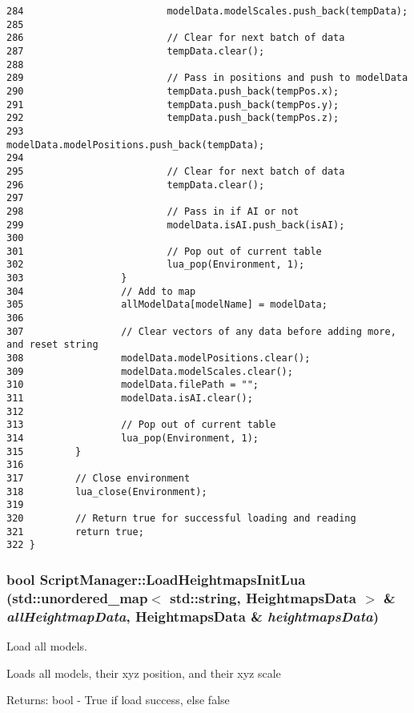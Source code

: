 \begin{Code}
\begin{verbatim}
284                         modelData.modelScales.push_back(tempData);
285 
286                         // Clear for next batch of data
287                         tempData.clear();
288 
289                         // Pass in positions and push to modelData
290                         tempData.push_back(tempPos.x);
291                         tempData.push_back(tempPos.y);
292                         tempData.push_back(tempPos.z);
293                         modelData.modelPositions.push_back(tempData);
294 
295                         // Clear for next batch of data
296                         tempData.clear();
297 
298                         // Pass in if AI or not
299                         modelData.isAI.push_back(isAI);
300 
301                         // Pop out of current table
302                         lua_pop(Environment, 1);
303                 }
304                 // Add to map
305                 allModelData[modelName] = modelData;
306 
307                 // Clear vectors of any data before adding more, and reset string
308                 modelData.modelPositions.clear();
309                 modelData.modelScales.clear();
310                 modelData.filePath = "";
311                 modelData.isAI.clear();
312 
313                 // Pop out of current table
314                 lua_pop(Environment, 1);
315         }
316 
317         // Close environment
318         lua_close(Environment);
319 
320         // Return true for successful loading and reading
321         return true;
322 }
\end{verbatim}
\end{Code}


\hypertarget{class_script_manager_3d83ba0f6648aad0eb0bca48665e93d4}{
\subsubsection[LoadHeightmapsInitLua]{\setlength{\rightskip}{0pt plus 5cm}bool ScriptManager::LoadHeightmapsInitLua (std::unordered\_\-map$<$ std::string, {\bf HeightmapsData} $>$ \& {\em allHeightmapData}, \/  {\bf HeightmapsData} \& {\em heightmapsData})}}
\label{class_script_manager_3d83ba0f6648aad0eb0bca48665e93d4}


Load all models. 

Loads all models, their xyz position, and their xyz scale

\begin{Desc}
\item[Returns:]bool - True if load success, else false \end{Desc}


